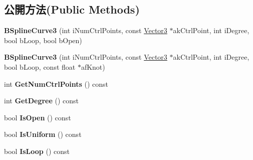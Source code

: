\subsection*{公開方法(Public Methods)}
\begin{DoxyCompactItemize}
\item 
{\bfseries B\+Spline\+Curve3} (int i\+Num\+Ctrl\+Points, const \hyperlink{class_i_dream_sky_1_1_vector3}{Vector3} $\ast$ak\+Ctrl\+Point, int i\+Degree, bool b\+Loop, bool b\+Open)\hypertarget{class_i_dream_sky_1_1_b_spline_curve3_aed0a9baed8c434e8806659147f39499e}{}\label{class_i_dream_sky_1_1_b_spline_curve3_aed0a9baed8c434e8806659147f39499e}

\item 
{\bfseries B\+Spline\+Curve3} (int i\+Num\+Ctrl\+Points, const \hyperlink{class_i_dream_sky_1_1_vector3}{Vector3} $\ast$ak\+Ctrl\+Point, int i\+Degree, bool b\+Loop, const float $\ast$af\+Knot)\hypertarget{class_i_dream_sky_1_1_b_spline_curve3_a8e3216c2fb6555f9eaab7fbae9a9095e}{}\label{class_i_dream_sky_1_1_b_spline_curve3_a8e3216c2fb6555f9eaab7fbae9a9095e}

\item 
int {\bfseries Get\+Num\+Ctrl\+Points} () const \hypertarget{class_i_dream_sky_1_1_b_spline_curve3_ac7680b82e98faf93ae72ee6266cf5f21}{}\label{class_i_dream_sky_1_1_b_spline_curve3_ac7680b82e98faf93ae72ee6266cf5f21}

\item 
int {\bfseries Get\+Degree} () const \hypertarget{class_i_dream_sky_1_1_b_spline_curve3_ac9cadd69bb472b1d6d2cb0144fb17024}{}\label{class_i_dream_sky_1_1_b_spline_curve3_ac9cadd69bb472b1d6d2cb0144fb17024}

\item 
bool {\bfseries Is\+Open} () const \hypertarget{class_i_dream_sky_1_1_b_spline_curve3_a3d44c3056156f2cb8ce598d723d98e74}{}\label{class_i_dream_sky_1_1_b_spline_curve3_a3d44c3056156f2cb8ce598d723d98e74}

\item 
bool {\bfseries Is\+Uniform} () const \hypertarget{class_i_dream_sky_1_1_b_spline_curve3_a9e724fa29946c0a2d35c0d7bd4e02f51}{}\label{class_i_dream_sky_1_1_b_spline_curve3_a9e724fa29946c0a2d35c0d7bd4e02f51}

\item 
bool {\bfseries Is\+Loop} () const \hypertarget{class_i_dream_sky_1_1_b_spline_curve3_ad5a2f47a6f2389931555844be3762ab1}{}\label{class_i_dream_sky_1_1_b_spline_curve3_ad5a2f47a6f2389931555844be3762ab1}


\end{DoxyCompactItemize}
